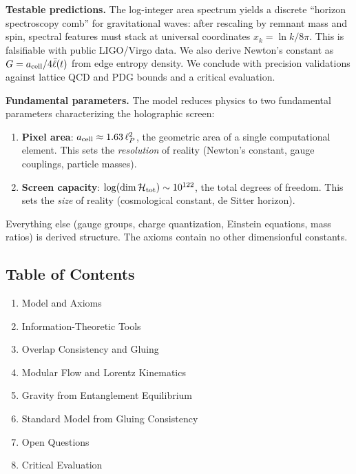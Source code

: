 \documentclass[
]{article}
\providecommand{\tightlist}{%
  \setlength{\itemsep}{0pt}\setlength{\parskip}{0pt}}
\begin{document}
\textbf{Testable predictions.} The log-integer area spectrum yields a
discrete ``horizon spectroscopy comb'' for gravitational waves: after
rescaling by remnant mass and spin, spectral features must stack at
universal coordinates \(x_k = \ln k / 8\pi\). This is falsifiable with
public LIGO/Virgo data. We also derive Newton's constant as
\(G = a_{\rm cell}/4\bar{\ell}(t)\) from edge entropy density. We
conclude with precision validations against lattice QCD and PDG bounds
and a critical evaluation.

\textbf{Fundamental parameters.} The model reduces physics to two
fundamental parameters characterizing the holographic screen:

\begin{enumerate}
\def\labelenumi{\arabic{enumi}.}
\item
  \textbf{Pixel area}: \(a_{\rm cell} \approx 1.63\,\ell_P^2\), the
  geometric area of a single computational element. This sets the
  \emph{resolution} of reality (Newton's constant, gauge couplings,
  particle masses).
\item
  \textbf{Screen capacity}:
  \(\log(\dim\mathcal{H}_{\rm tot}) \sim 10^{122}\), the total degrees
  of freedom. This sets the \emph{size} of reality (cosmological
  constant, de Sitter horizon).
\end{enumerate}

Everything else (gauge groups, charge quantization, Einstein equations,
mass ratios) is derived structure. The axioms contain no other
dimensionful constants.

\subsection{Table of Contents}\label{table-of-contents}

\begin{enumerate}
\def\labelenumi{\arabic{enumi}.}
\tightlist
\item
  Model and Axioms
\item
  Information-Theoretic Tools
\item
  Overlap Consistency and Gluing
\item
  Modular Flow and Lorentz Kinematics
\item
  Gravity from Entanglement Equilibrium
\item
  Standard Model from Gluing Consistency
\item
  Open Questions
\item
  Critical Evaluation
\end{enumerate}
\end{document}
